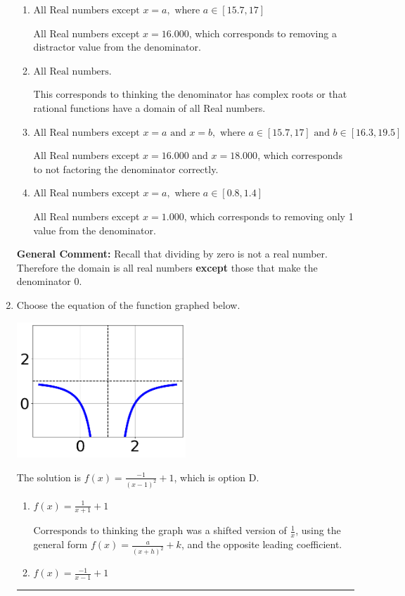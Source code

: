 \documentclass{extbook}[14pt]
\newcommand{\litem}[1]{\item #1

\rule{\textwidth}{0.4pt}}
\begin{document}
\begin{enumerate}
{\begin{enumerate}[label=\Alph*.]
All Real numbers except $x = 1.000$ and $x = 2.000$, which is the correct option.
\item \( \text{All Real numbers except } x = a, \text{ where } a \in [15.7, 17] \)

All Real numbers except $x = 16.000$, which corresponds to removing a distractor value from the denominator.
\item \( \text{All Real numbers.} \)

This corresponds to thinking the denominator has complex roots or that rational functions have a domain of all Real numbers.
\item \( \text{All Real numbers except } x = a \text{ and } x = b, \text{ where } a \in [15.7, 17] \text{ and } b \in [16.3, 19.5] \)

All Real numbers except $x = 16.000$ and $x = 18.000$, which corresponds to not factoring the denominator correctly.
\item \( \text{All Real numbers except } x = a, \text{ where } a \in [0.8, 1.4] \)

All Real numbers except $x = 1.000$, which corresponds to removing only 1 value from the denominator.
\end{enumerate}

\textbf{General Comment:} Recall that dividing by zero is not a real number. Therefore the domain is all real numbers \textbf{except} those that make the denominator 0.
}
\litem{
Choose the equation of the function graphed below.

\begin{center}
    \includegraphics[width=0.5\textwidth]{../Figures/rationalGraphToEquationB.png}
\end{center}


The solution is \( f(x) = \frac{-1}{(x - 1)^2} + 1 \), which is option D.\begin{enumerate}[label=\Alph*.]
\item \( f(x) = \frac{1}{x + 1} + 1 \)

Corresponds to thinking the graph was a shifted version of $\frac{1}{x}$, using the general form $f(x) = \frac{a}{(x+h)^2}+k$, and the opposite leading coefficient.
\item \( f(x) = \frac{-1}{x - 1} + 1 \)


\end{enumerate}}
\end{enumerate}
\end{document}
